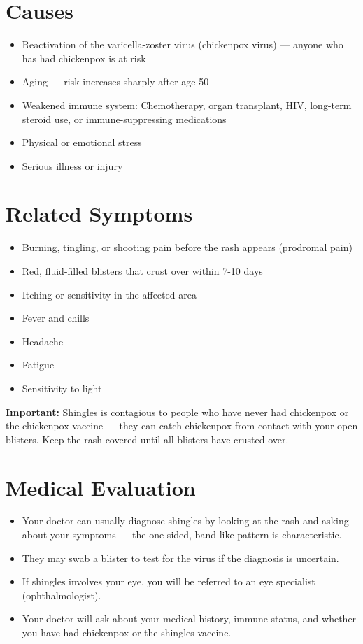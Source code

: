 \section*{Causes}
\begin{itemize}
  \item Reactivation of the varicella-zoster virus (chickenpox virus) — anyone who has had chickenpox is at risk
  \item Aging — risk increases sharply after age 50
  \item Weakened immune system: Chemotherapy, organ transplant, HIV, long-term steroid use, or immune-suppressing medications
  \item Physical or emotional stress
  \item Serious illness or injury
\end{itemize}

\section*{Related Symptoms}
\begin{itemize}
  \item Burning, tingling, or shooting pain before the rash appears (prodromal pain)
  \item Red, fluid-filled blisters that crust over within 7-10 days
  \item Itching or sensitivity in the affected area
  \item Fever and chills
  \item Headache
  \item Fatigue
  \item Sensitivity to light
\end{itemize}
\textbf{Important:} Shingles is contagious to people who have never had chickenpox or the chickenpox vaccine — they can catch chickenpox from contact with your open blisters. Keep the rash covered until all blisters have crusted over.

\section*{Medical Evaluation}
\begin{itemize}
  \item Your doctor can usually diagnose shingles by looking at the rash and asking about your symptoms — the one-sided, band-like pattern is characteristic.
  \item They may swab a blister to test for the virus if the diagnosis is uncertain.
  \item If shingles involves your eye, you will be referred to an eye specialist (ophthalmologist).
  \item Your doctor will ask about your medical history, immune status, and whether you have had chickenpox or the shingles vaccine.
\end{itemize}


